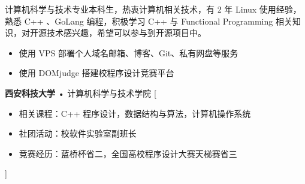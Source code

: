 \documentclass[zh]{resume}
\begin{document}
\makeheader

{\onehalfspacing\hspace{2em}%
计算机科学与技术专业本科生，热衷计算机相关技术，有 2 年 Linux 使用经验，熟悉 C++ 、GoLang 编程，积极学习 C++ 与 Functional Programming 相关知识，对开源技术感兴趣，希望可以参与到开源项目中。
\par}

\begin{competences}
\end{competences}

\begin{itemize}
  \item {使用 VPS 部署个人域名邮箱、博客、Git、私有网盘等服务}
  \item {使用 DOMjudge 搭建校程序设计竞赛平台}
\end{itemize}

\begin{experiences}
  {\textbf{西安科技大学} • 计算机科学与技术学院}
  [\begin{itemize}
     \item {相关课程：C++ 程序设计，数据结构与算法，计算机操作系统}
     \item {社团活动：校软件实验室副班⻓}
     \item {竞赛经历：蓝桥杯省二，全国高校程序设计大赛天梯赛省三}
   \end{itemize}]
\end{experiences}
\end{document}
